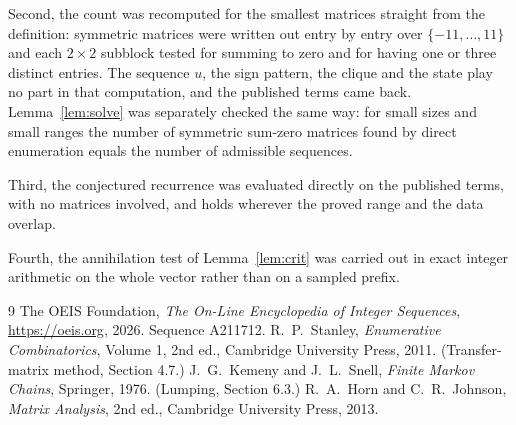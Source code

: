 \documentclass[11pt,a4paper]{article}
\theoremstyle{plain}
\theoremstyle{definition}
\begin{document}
Second, the count was recomputed for the smallest matrices straight from the definition:
symmetric matrices were written out entry by entry over $\{-11,\dots,11\}$ and each
$2\times2$ subblock tested for summing to zero and for having one or three distinct entries. The
sequence $u$, the sign pattern, the clique and the state play no part in that computation, and
the published terms came back. Lemma~\ref{lem:solve} was separately checked the same way: for
small sizes and small ranges the number of symmetric sum-zero matrices found by direct
enumeration equals the number of admissible sequences.

Third, the conjectured recurrence was evaluated directly on the published terms, with no
matrices involved, and holds wherever the proved range and the data overlap.

Fourth, the annihilation test of Lemma~\ref{lem:crit} was carried out in exact integer
arithmetic on the whole vector rather than on a sampled prefix.

\begin{thebibliography}{9}
 The OEIS Foundation, \emph{The On-Line Encyclopedia of Integer
Sequences}, \url{https://oeis.org}, 2026. Sequence A211712.
 R.~P.~Stanley, \emph{Enumerative Combinatorics}, Volume 1, 2nd ed.,
Cambridge University Press, 2011. (Transfer-matrix method, Section 4.7.)
 J.~G.~Kemeny and J.~L.~Snell, \emph{Finite Markov Chains}, Springer, 1976.
(Lumping, Section 6.3.)
 R.~A.~Horn and C.~R.~Johnson, \emph{Matrix Analysis}, 2nd ed., Cambridge
University Press, 2013.
\end{thebibliography}
\end{document}
